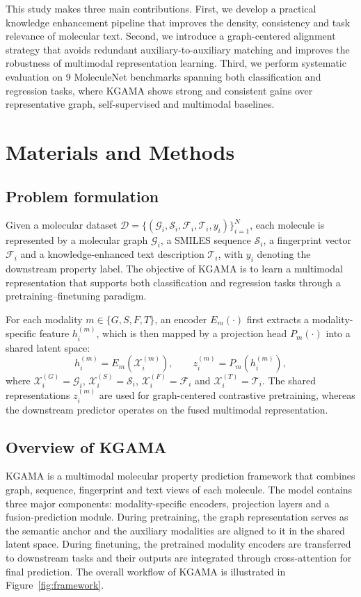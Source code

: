 \documentclass[webpdf,contemporary,large]{oup-authoring-template}%
\begin{document}
This study makes three main contributions. First, we develop a practical knowledge enhancement pipeline that improves the density, consistency and task relevance of molecular text. Second, we introduce a graph-centered alignment strategy that avoids redundant auxiliary-to-auxiliary matching and improves the robustness of multimodal representation learning. Third, we perform systematic evaluation on 9 MoleculeNet benchmarks spanning both classification and regression tasks, where KGAMA shows strong and consistent gains over representative graph, self-supervised and multimodal baselines.

\section{Materials and Methods}
\subsection{Problem formulation}
Given a molecular dataset $\mathcal{D}=\{(\mathcal{G}_i,\mathcal{S}_i,\mathcal{F}_i,\mathcal{T}_i,y_i)\}_{i=1}^{N}$, each molecule is represented by a molecular graph $\mathcal{G}_i$, a SMILES sequence $\mathcal{S}_i$, a fingerprint vector $\mathcal{F}_i$ and a knowledge-enhanced text description $\mathcal{T}_i$, with $y_i$ denoting the downstream property label. The objective of KGAMA is to learn a multimodal representation that supports both classification and regression tasks through a pretraining--finetuning paradigm.

For each modality $m \in \{G,S,F,T\}$, an encoder $E_m(\cdot)$ first extracts a modality-specific feature $h_i^{(m)}$, which is then mapped by a projection head $P_m(\cdot)$ into a shared latent space:
\begin{equation}
    h_i^{(m)} = E_m(\mathcal{X}_i^{(m)}), \qquad z_i^{(m)} = P_m\left(h_i^{(m)}\right),
\end{equation}
where $\mathcal{X}_i^{(G)}=\mathcal{G}_i$, $\mathcal{X}_i^{(S)}=\mathcal{S}_i$, $\mathcal{X}_i^{(F)}=\mathcal{F}_i$ and $\mathcal{X}_i^{(T)}=\mathcal{T}_i$. The shared representations $z_i^{(m)}$ are used for graph-centered contrastive pretraining, whereas the downstream predictor operates on the fused multimodal representation.

\subsection{Overview of KGAMA}
KGAMA is a multimodal molecular property prediction framework that combines graph, sequence, fingerprint and text views of each molecule. The model contains three major components: modality-specific encoders, projection layers and a fusion-prediction module. During pretraining, the graph representation serves as the semantic anchor and the auxiliary modalities are aligned to it in the shared latent space. During finetuning, the pretrained modality encoders are transferred to downstream tasks and their outputs are integrated through cross-attention for final prediction. The overall workflow of KGAMA is illustrated in Figure~\ref{fig:framework}.
\end{document}
